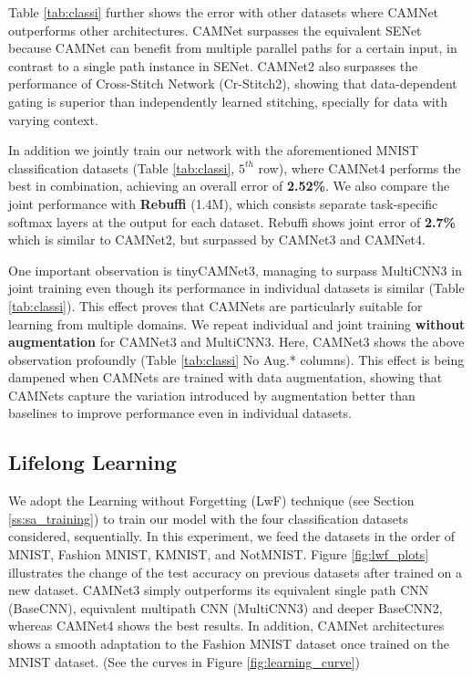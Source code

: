 \documentclass[10pt,twocolumn,letterpaper]{article}
\begin{document}
Table \ref{tab:classi} further shows the error with other datasets where CAMNet outperforms other architectures. CAMNet surpasses the equivalent SENet because CAMNet can benefit from multiple parallel paths for a certain input, in contrast to a single path instance in SENet. CAMNet2 also surpasses the performance of Cross-Stitch Network (Cr-Stitch2), showing that data-dependent gating is superior than independently learned stitching, specially for data with varying context. 

In addition we jointly train our network with the aforementioned MNIST classification datasets (Table \ref{tab:classi}, $5^{th}$ row), where CAMNet4 performs the best in combination, achieving an overall error of \textbf{2.52\%}. We also compare the joint performance with \textbf{Rebuffi \etal} \cite{residual-adapters} (1.4M), which consists separate task-specific softmax layers at the output for each dataset. Rebuffi \etal shows joint error of \textbf{2.7\%} which is similar to CAMNet2, but surpassed by CAMNet3 and CAMNet4.

One important observation is tinyCAMNet3, managing to surpass MultiCNN3 in joint training even though its performance in individual datasets is similar (Table \ref{tab:classi}). This effect proves that CAMNets are particularly suitable for learning from multiple domains. We repeat individual and joint training \textbf{without augmentation} for CAMNet3 and MultiCNN3. Here, CAMNet3 shows the above observation profoundly (Table \ref{tab:classi} No Aug.* columns). This effect is being dampened when CAMNets are trained with data augmentation, showing that CAMNets capture the variation introduced by augmentation better than baselines to improve performance even in individual datasets.





\subsection{Lifelong Learning}
\label{ss:seq_mul}
\vspace{-0.05in}

We adopt the Learning without Forgetting (LwF) technique (see Section \ref{ss:sa_training}) to train our model with the four classification datasets considered, sequentially. In this experiment, we feed the datasets in the order of MNIST, Fashion MNIST, KMNIST, and NotMNIST. Figure \ref{fig:lwf_plots} illustrates the change of the test accuracy on previous datasets after trained on a new dataset. CAMNet3 simply outperforms its equivalent single path CNN (BaseCNN), equivalent multipath CNN (MultiCNN3) and deeper BaseCNN2, whereas CAMNet4 shows the best results. In addition, CAMNet architectures shows a smooth adaptation to the Fashion MNIST dataset once trained on the MNIST dataset. (See the curves in Figure \ref{fig:learning_curve})
\end{document}
